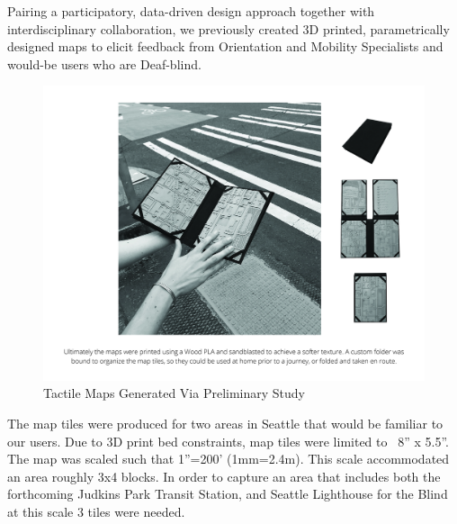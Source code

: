 Pairing a participatory, data-driven design approach together with interdisciplinary collaboration, we previously created 3D printed, parametrically designed maps to elicit feedback from Orientation and Mobility Specialists and would-be users who are Deaf-blind.


\begin{figure}
    \centering
    \includegraphics[width=5in]{pics/ProjPilot.jpg}
    \caption{Tactile Maps Generated Via Preliminary Study}
    \label{fig:pilot}
\end{figure}


The map tiles were produced for two areas in Seattle that would be familiar to our users.
Due to 3D print bed constraints, map tiles were limited to ~8” x 5.5”.  The map was scaled such that 1”=200’ (1mm=2.4m). This scale accommodated an area roughly 3x4 blocks. In order to capture an area that includes both the forthcoming Judkins Park Transit Station, and Seattle Lighthouse for the Blind at this scale 3 tiles were needed.   

